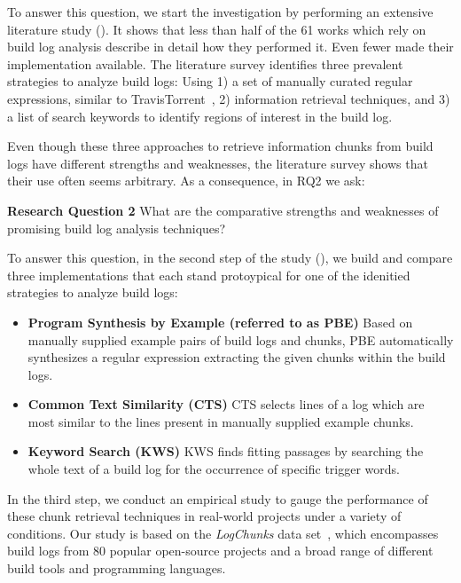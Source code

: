 To answer this question, we start the investigation by performing an
extensive literature study ().
It shows that
less than half of the 61 works which rely on build log analysis
describe in detail how they performed it.
Even fewer
made their implementation available.
The literature
survey identifies three prevalent strategies to
analyze build logs: Using 1) a set of
manually curated regular expressions,
similar to TravisTorrent~\cite{beller2017oops},
2) information
retrieval techniques,
and 3) a list of search keywords
to identify regions of interest in the build log.

Even though these three approaches to retrieve information chunks from
build logs have different strengths and weaknesses, the literature
survey shows that their use often seems arbitrary.
As a consequence,
in RQ2 we ask:

\begin{simplebox}[minipage boxed title*=-5cm]{\textbf{Research Question
2}}
What are the comparative strengths and weaknesses
of promising build log analysis techniques?
\end{simplebox}

To answer this question, in the second step of the study
(), we build and compare three
implementations that each stand protoypical for one of the idenitied
strategies to analyze build logs:

\begin{itemize}
  \item \textbf{Program Synthesis by Example (referred to as PBE)}
  Based on manually supplied example pairs of build logs and chunks,
  PBE automatically
  synthesizes
  a regular expression extracting the given chunks within the build logs.
  \item \textbf{Common Text Similarity (CTS)}
  CTS selects lines of a log which are
  most similar to the lines present in manually supplied example chunks.
  \item \textbf{Keyword Search (KWS)}
  KWS finds fitting passages by searching the whole
  text of a build log for
  the occurrence of specific trigger words.
\end{itemize}


In the third step, we conduct an empirical study to gauge the performance
of
these chunk retrieval techniques in
real-world projects under a variety of conditions.
Our study is based on the \emph{LogChunks} data
set~\cite{brandt2020logchunks}, which encompasses build logs from
80 popular open-source projects and a broad range of different
build tools and programming languages.

